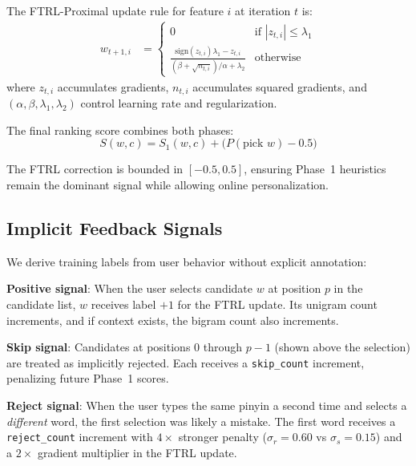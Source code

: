 \documentclass[11pt]{article}
\begin{document}
The FTRL-Proximal update rule for feature $i$ at iteration $t$ is:
\begin{align}
w_{t+1,i} &= \begin{cases}
  0 & \text{if } |z_{t,i}| \leq \lambda_1 \\
  \frac{\text{sign}(z_{t,i})\lambda_1 - z_{t,i}}
       {(\beta + \sqrt{n_{t,i}})/\alpha + \lambda_2} & \text{otherwise}
\end{cases}
\end{align}
where $z_{t,i}$ accumulates gradients, $n_{t,i}$ accumulates squared
gradients, and $(\alpha, \beta, \lambda_1, \lambda_2)$ control learning rate
and regularization.

The final ranking score combines both phases:
\begin{equation}
S(w, c) = S_1(w, c) + \big(P(\text{pick } w) - 0.5\big)
\end{equation}

The FTRL correction is bounded in $[-0.5, 0.5]$, ensuring Phase~1 heuristics
remain the dominant signal while allowing online personalization.

\subsection{Implicit Feedback Signals}

We derive training labels from user behavior without explicit annotation:

\textbf{Positive signal}: When the user selects candidate $w$ at position $p$
in the candidate list, $w$ receives label $+1$ for the FTRL update. Its
unigram count increments, and if context exists, the bigram count also
increments.

\textbf{Skip signal}: Candidates at positions $0$ through $p-1$ (shown above
the selection) are treated as implicitly rejected. Each receives a
\texttt{skip\_count} increment, penalizing future Phase~1 scores.

\textbf{Reject signal}: When the user types the same pinyin a second time and
selects a \emph{different} word, the first selection was likely a mistake.
The first word receives a \texttt{reject\_count} increment with $4\times$
stronger penalty ($\sigma_r=0.60$ vs $\sigma_s=0.15$) and a $2\times$
gradient multiplier in the FTRL update.

\end{document}
